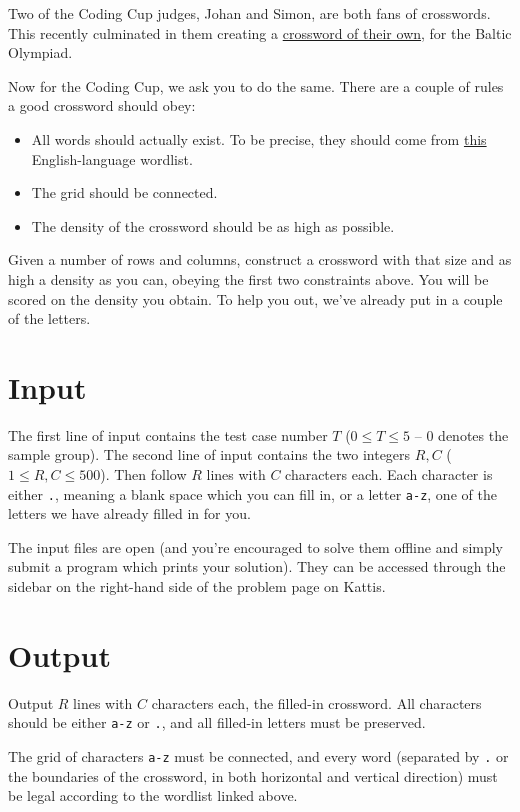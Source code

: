Two of the Coding Cup judges, Johan and Simon, are both fans of crosswords.
This recently culminated in them creating a \href{http://boi2018.progolymp.se/day4.pdf}{crossword of their own},
for the Baltic Olympiad.

Now for the Coding Cup, we ask you to do the same. There are a couple of rules a good crossword should obey:
\begin{itemize}
  \item All words should actually exist. To be precise, they should come from \href{http://codingcup.se/2018/wordlist.txt}{this} English-language wordlist.
  \item The grid should be connected.
  \item The density of the crossword should be as high as possible.
\end{itemize}

Given a number of rows and columns, construct a crossword with that size and as high a
density as you can, obeying the first two constraints above.
You will be scored on the density you obtain.
To help you out, we've already put in a couple of the letters.

\section*{Input}
The first line of input contains the test case number $T$ ($0 \le T \le 5$ -- $0$ denotes the sample group).
The second line of input contains the two integers $R, C$ ($1 \le R, C \le 500$).
Then follow $R$ lines with $C$ characters each. Each character is either \texttt{.},
meaning a blank space which you can fill in, or a letter \texttt{a-z}, one of the
letters we have already filled in for you.

The input files are open (and you're encouraged to solve them offline and simply
submit a program which prints your solution). They can be accessed through the
sidebar on the right-hand side of the problem page on Kattis.

\section*{Output}
Output $R$ lines with $C$ characters each, the filled-in crossword.
All characters should be either \texttt{a-z} or \texttt{.}, and all filled-in
letters must be preserved.

The grid of characters \texttt{a-z} must be connected, and every word
(separated by \texttt{.} or the boundaries of the crossword, in both
horizontal and vertical direction) must be legal according to the wordlist
linked above.

